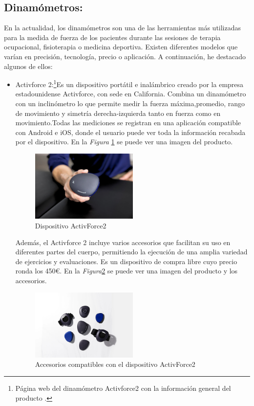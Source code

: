 \subsection{Dinamómetros:}
En la actualidad, los dinamómetros son una de las herramientas más utilizadas  para la medida de fuerza de los pacientes durante las sesiones de terapia ocupacional, fisioterapia o medicina deportiva. Existen diferentes modelos que varían en precisión, tecnología, precio o aplicación. 
A continuación, he destacado algunos de ellos:
\begin{itemize}
    \item Activforce 2:\cite{activforce}\footnote{Página web del dinamómetro Activforce2 con la información general del producto \cite{activforce}.}Es un dispositivo portátil e inalámbrico creado por la empresa estadounidense Activforce, con sede en California. Combina un dinamómetro con un inclinómetro lo que permite medir la fuerza máxima,promedio, rango de movimiento y simetría derecha-izquierda tanto en fuerza como en movimiento.Todas las mediciones se registran en una aplicación compatible con Android e iOS, donde el usuario puede ver toda la información recabada por el dispositivo. En la \textit{Figura} \ref{fig:activforce} se puede ver una imagen del producto.
    \begin{figure}[h]
        \centering
        \includegraphics[width=0.5\textwidth]{img/ActivForce_Device.jpg}
        \caption{Dispositivo ActivForce2}
        \label{fig:activforce}
    \end{figure}
    
    Además, el Activforce 2 incluye varios accesorios que facilitan su uso en diferentes partes del cuerpo, permitiendo la ejecución de una amplia variedad de ejercicios y evaluaciones. Es un dispositivo de compra libre cuyo precio ronda los 450€. En la \textit{Figura}\ref{fig:activforce_Attachments} se puede ver una imagen del producto y los accesorios.
    \begin{figure}[h]
        \centering
        \includegraphics[width=0.5\textwidth]{img/ActivForce_Attachments.jpg}
        \caption{Accesorios compatibles con el dispositivo ActivForce2}
        \label{fig:activforce_Attachments}
    \end{figure}


\end{itemize}
